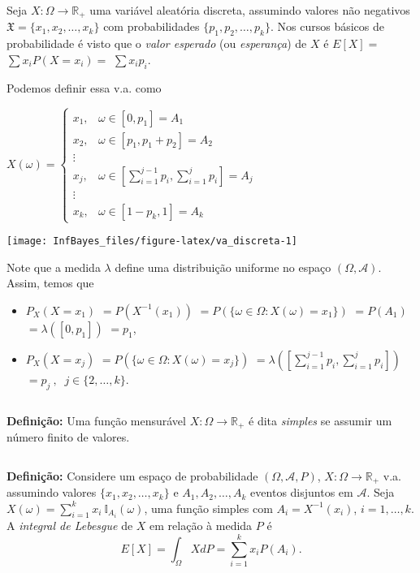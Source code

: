 \documentclass[
]{book}
\begin{document}
Seja \(X: \Omega \longrightarrow \mathbb{R}_+\) uma variável aleatória discreta, assumindo valores não negativos \(\mathfrak{X}=\{x_1,x_2,\ldots,x_k\}\) com probabilidades \(\{p_1,p_2,\ldots,p_k\}\). Nos cursos básicos de probabilidade é visto que o \emph{valor esperado} (ou \emph{esperança}) de \(X\) é \(E[X] =\) \(\sum x_i P(X=x_i) =\) \(\sum x_i p_i\).

Podemos definir essa v.a. como

\(X(\omega) = \left\{\begin{array}{ll} x_1, & \omega \in [0,p_1] = A_1 \\  x_2, & \omega \in [p_1,p_1+p_2] = A_2 \\  \vdots & \\  x_j, & \omega \in \left[\displaystyle\sum_{i=1}^{j-1} p_i,\sum_{i=1}^{j} p_i\right] = A_j \\  \vdots & \\  x_k, & \omega \in [1-p_k,1] = A_k \end{array}\right.\)

\begin{center}\texttt{[image: InfBayes\_files/figure-latex/va\_discreta-1]} \end{center}

Note que a medida \(\lambda\) define uma distribuição uniforme no espaço \((\Omega,\mathcal{A})\). Assim, temos que

\begin{itemize}
\item
  \(P_X(X=x_1)\) \(=P\left(X^{-1}(x_1)\right)\) \(=P\left(\{\omega \in \Omega : X(\omega)=x_1\}\right)\) \(=P(A_1)\) \(=\lambda\left([0,p_1]\right)\) \(=p_1\),
\item
  \(P_X(X=x_j)\) \(=P\left(\{\omega \in \Omega : X(\omega)=x_j\}\right)\) \(=\lambda\left(\left[\sum_{i=1}^{j-1} p_i,\sum_{i=1}^{j} p_i\right]\right)\) \(=p_j ~,~\) \(j \in \{2,\ldots,k\}\).
\end{itemize}

\(~\)

\textbf{Definição:} Uma função mensurável \(X: \Omega \longrightarrow \mathbb{R}_+\) é dita \emph{simples} se assumir um número finito de valores.

\(~\)

\textbf{Definição:} Considere um espaço de probabilidade \((\Omega, \mathcal{A}, P)\), \(X:\Omega\longrightarrow \mathbb{R}_+\) v.a. assumindo valores \(\{x_1,x_2,\ldots,x_k\}\) e \(A_1,A_2,\ldots,A_k\) eventos disjuntos em \(\mathcal{A}\). Seja \(\displaystyle X(\omega) = \sum_{i=1}^{k} x_i ~\mathbb{I}_{A_i}(\omega)\), uma função simples com \(A_i = X^{-1}(x_i)\), \(i=1,\ldots,k\). A \emph{integral de Lebesgue} de \(X\) em relação à medida \(P\) é
\[E[X] = \int_\Omega X dP = \sum_{i=1}^{k} x_i P(A_i).\]
\end{document}
